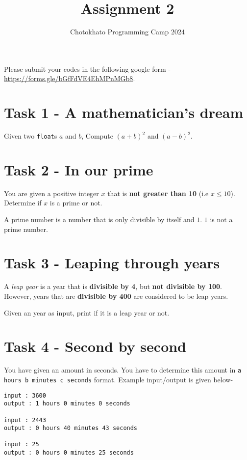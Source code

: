 \documentclass{article}
\title{Assignment 2}
\author{Chotokhato Programming Camp 2024}
\begin{document}
\maketitle

Please submit your codes in the following google form - \url{https://forms.gle/bGfFdVE4EhMPnMGb8}.


\section*{Task 1 - A mathematician's dream}
Given two \verb|float|s $a$ and $b$, Compute $(a+b)^2$ and $(a-b)^2$.

\section*{Task 2 - In our prime}
You are given a positive integer $x$ that is \textbf{not greater than 10} (i.e $x \le 10$). Determine if $x$ is a prime or not.

A prime number is a number that is only divisible by itself and $1$. $1$ is not a prime number.

\section*{Task 3 - Leaping through years} 
A \textit{leap year} is a year that is \textbf{divisible by 4}, but \textbf{not divisible by 100}. However, years that are \textbf{divisible by 400} are considered to be leap years.

Given an year as input, print if it is a leap year or not.

\section*{Task 4 - Second by second}
You have given an amount in seconds. You have to determine this amount in \verb|a hours b minutes c seconds| format. Example input/output is given below-

\begin{lstlisting}
input : 3600
output : 1 hours 0 minutes 0 seconds

input : 2443
output : 0 hours 40 minutes 43 seconds

input : 25
output : 0 hours 0 minutes 25 seconds
\end{lstlisting}
\end{document}
